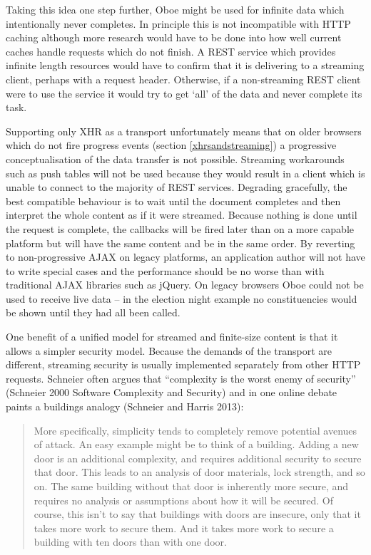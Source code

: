 \documentclass[12pt, ]{article}
\begin{document}
Taking this idea one step further, Oboe might be used for infinite data
which intentionally never completes. In principle this is not
incompatible with HTTP caching although more research would have to be
done into how well current caches handle requests which do not finish. A
REST service which provides infinite length resources would have to
confirm that it is delivering to a streaming client, perhaps with a
request header. Otherwise, if a non-streaming REST client were to use
the service it would try to get `all' of the data and never complete its
task.

Supporting only XHR as a transport unfortunately means that on older
browsers which do not fire progress events (section
\ref{xhrsandstreaming}) a progressive conceptualisation of the data
transfer is not possible. Streaming workarounds such as push tables will
not be used because they would result in a client which is unable to
connect to the majority of REST services. Degrading gracefully, the best
compatible behaviour is to wait until the document completes and then
interpret the whole content as if it were streamed. Because nothing is
done until the request is complete, the callbacks will be fired later
than on a more capable platform but will have the same content and be in
the same order. By reverting to non-progressive AJAX on legacy
platforms, an application author will not have to write special cases
and the performance should be no worse than with traditional AJAX
libraries such as jQuery. On legacy browsers Oboe could not be used to
receive live data -- in the election night example no constituencies
would be shown until they had all been called.

One benefit of a unified model for streamed and finite-size content is
that it allows a simpler security model. Because the demands of the
transport are different, streaming security is usually implemented
separately from other HTTP requests. Schneier often argues that
``complexity is the worst enemy of security'' (Schneier 2000 Software
Complexity and Security) and in one online debate paints a buildings
analogy (Schneier and Harris 2013):

\begin{quote}
More specifically, simplicity tends to completely remove potential
avenues of attack. An easy example might be to think of a building.
Adding a new door is an additional complexity, and requires additional
security to secure that door. This leads to an analysis of door
materials, lock strength, and so on. The same building without that door
is inherently more secure, and requires no analysis or assumptions about
how it will be secured. Of course, this isn't to say that buildings with
doors are insecure, only that it takes more work to secure them. And it
takes more work to secure a building with ten doors than with one door.
\end{quote}
\end{document}
